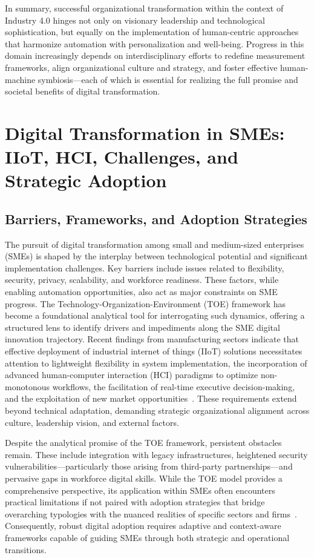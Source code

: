 \documentclass[sigconf]{acmart}
\begin{document}
In summary, successful organizational transformation within the context of Industry 4.0 hinges not only on visionary leadership and technological sophistication, but equally on the implementation of human-centric approaches that harmonize automation with personalization and well-being. Progress in this domain increasingly depends on interdisciplinary efforts to redefine measurement frameworks, align organizational culture and strategy, and foster effective human-machine symbiosis—each of which is essential for realizing the full promise and societal benefits of digital transformation.

\section{Digital Transformation in SMEs: IIoT, HCI, Challenges, and Strategic Adoption}

\subsection{Barriers, Frameworks, and Adoption Strategies}

The pursuit of digital transformation among small and medium-sized enterprises (SMEs) is shaped by the interplay between technological potential and significant implementation challenges. Key barriers include issues related to flexibility, security, privacy, scalability, and workforce readiness. These factors, while enabling automation opportunities, also act as major constraints on SME progress. The Technology-Organization-Environment (TOE) framework has become a foundational analytical tool for interrogating such dynamics, offering a structured lens to identify drivers and impediments along the SME digital innovation trajectory. Recent findings from manufacturing sectors indicate that effective deployment of industrial internet of things (IIoT) solutions necessitates attention to lightweight flexibility in system implementation, the incorporation of advanced human-computer interaction (HCI) paradigms to optimize non-monotonous workflows, the facilitation of real-time executive decision-making, and the exploitation of new market opportunities~\cite{ref89}. These requirements extend beyond technical adaptation, demanding strategic organizational alignment across culture, leadership vision, and external factors.

Despite the analytical promise of the TOE framework, persistent obstacles remain. These include integration with legacy infrastructures, heightened security vulnerabilities—particularly those arising from third-party partnerships—and pervasive gaps in workforce digital skills. While the TOE model provides a comprehensive perspective, its application within SMEs often encounters practical limitations if not paired with adoption strategies that bridge overarching typologies with the nuanced realities of specific sectors and firms~\cite{ref89}. Consequently, robust digital adoption requires adaptive and context-aware frameworks capable of guiding SMEs through both strategic and operational transitions.
\end{document}
